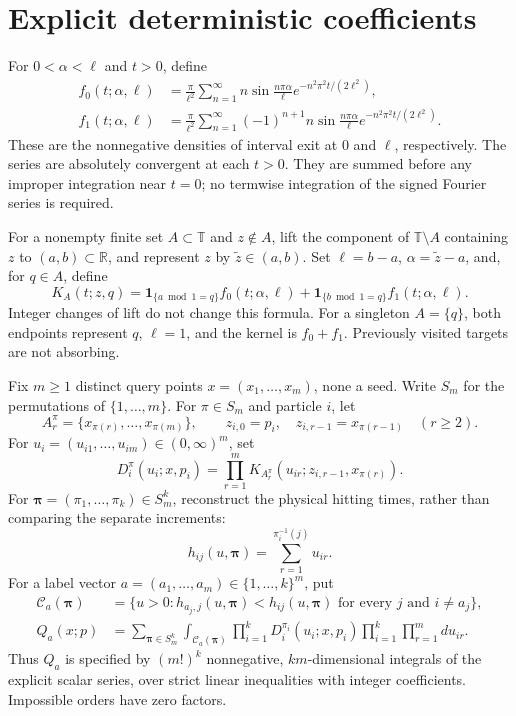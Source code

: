 \documentclass[11pt]{article}
\newcommand{\T}{\mathbb T}
\newcommand{\R}{\mathbb R}
\newcommand{\ind}{\mathbf 1}
\begin{document}
\section{Explicit deterministic coefficients}
For $0<\alpha<\ell$ and $t>0$, define
\begin{align}
 f_0(t;\alpha,\ell)
 &=\frac{\pi}{\ell^2}\sum_{n=1}^{\infty}
 n\sin\frac{n\pi\alpha}{\ell}
       e^{-n^2\pi^2t/(2\ell^2)},\label{flux0}\\
 f_1(t;\alpha,\ell)
 &=\frac{\pi}{\ell^2}\sum_{n=1}^{\infty}
 (-1)^{n+1}n\sin\frac{n\pi\alpha}{\ell}
       e^{-n^2\pi^2t/(2\ell^2)}.\label{flux1}
\end{align}
These are the nonnegative densities of interval exit at $0$ and $\ell$,
respectively. The series are absolutely convergent at each $t>0$.
They are summed before any improper integration near $t=0$; no
termwise integration of the signed Fourier series is required.

For a nonempty finite set $A\subset\T$ and $z\notin A$, lift the component
of $\T\setminus A$ containing $z$ to $(a,b)\subset\R$, and represent
$z$ by $\widetilde z\in(a,b)$. Set $\ell=b-a$, $\alpha=\widetilde z-a$,
and, for $q\in A$, define
\begin{equation}\label{kernel}
 K_A(t;z,q)=\ind_{\{a\bmod1=q\}}f_0(t;\alpha,\ell)
            +\ind_{\{b\bmod1=q\}}f_1(t;\alpha,\ell).
\end{equation}
Integer changes of lift do not change this formula. For a singleton
$A=\{q\}$, both endpoints represent $q$, $\ell=1$, and the kernel is
$f_0+f_1$. Previously visited targets are not absorbing.

Fix $m\geq1$ distinct query points $x=(x_1,\ldots,x_m)$, none a seed.
Write $S_m$ for the permutations of $\{1,\ldots,m\}$. For $\pi\in S_m$
and particle $i$, let
\[
 A_r^\pi=\{x_{\pi(r)},\ldots,x_{\pi(m)}\},\qquad
 z_{i,0}=p_i,\quad z_{i,r-1}=x_{\pi(r-1)}\quad(r\geq2).
\]
For $u_i=(u_{i1},\ldots,u_{im})\in(0,\infty)^m$, set
\begin{equation}\label{density}
 D_i^\pi(u_i;x,p_i)=\prod_{r=1}^m
 K_{A_r^\pi}(u_{ir};z_{i,r-1},x_{\pi(r)}).
\end{equation}
For $\boldsymbol\pi=(\pi_1,\ldots,\pi_k)\in S_m^k$, reconstruct the
physical hitting times, rather than comparing the separate increments:
\begin{equation}\label{clock}
 h_{ij}(u,\boldsymbol\pi)=\sum_{r=1}^{\pi_i^{-1}(j)}u_{ir}.
\end{equation}
For a label vector $a=(a_1,\ldots,a_m)\in\{1,\ldots,k\}^m$, put
\begin{align}
 \mathcal C_a(\boldsymbol\pi)
 &=\{u>0:h_{a_j,j}(u,\boldsymbol\pi)<h_{ij}(u,\boldsymbol\pi)
               \text{ for every }j\text{ and }i\ne a_j\},\label{cone}\\
 Q_a(x;p)
 &=\sum_{\boldsymbol\pi\in S_m^k}
   \int_{\mathcal C_a(\boldsymbol\pi)}
   \prod_{i=1}^kD_i^{\pi_i}(u_i;x,p_i)
   \prod_{i=1}^k\prod_{r=1}^mdu_{ir}.\label{ownership}
\end{align}
Thus $Q_a$ is specified by $(m!)^k$ nonnegative, $km$-dimensional
integrals of the explicit scalar series, over strict linear inequalities
with integer coefficients. Impossible orders have zero factors.
\end{document}
